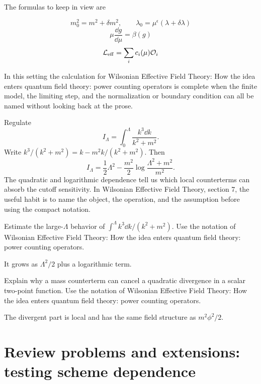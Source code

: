 The formulas to keep in view are

\[
  m_0^2=m^2+\delta m^2,\qquad \lambda_0=\mu^\epsilon(\lambda+\delta\lambda)
\]
\[
  \mu\frac{\dd g}{\dd\mu}=\beta(g)
\]
\[
  \mathcal L_{\mathrm{eff}}=\sum_i c_i(\mu)\mathcal O_i
\]

In this setting the calculation for Wilsonian Effective Field Theory: How the idea enters quantum field theory: power counting operators is complete when the finite model, the limiting step, and the normalization or boundary condition can all be named without looking back at the prose.




\begin{example}
Regulate
\[
  I_\Lambda=\int_0^\Lambda\frac{k^3\dd k}{k^2+m^2}.
\]
Write \(k^3/(k^2+m^2)=k-m^2k/(k^2+m^2)\).  Then
\[
  I_\Lambda=\frac12\Lambda^2-\frac{m^2}{2}\log\frac{\Lambda^2+m^2}{m^2}.
\]
The quadratic and logarithmic dependence tell us which local counterterms can absorb the cutoff sensitivity.  In Wilsonian Effective Field Theory, section 7, the useful habit is to name the object, the operation, and the assumption before using the compact notation.
\end{example}



\begin{exercise}
Estimate the large-\(\Lambda\) behavior of \(\int^\Lambda k^3\dd k/(k^2+m^2)\).  Use the notation of Wilsonian Effective Field Theory: How the idea enters quantum field theory: power counting operators.
\begin{answer}
It grows as \(\Lambda^2/2\) plus a logarithmic term.
\end{answer}
\end{exercise}

\begin{exercise}
Explain why a mass counterterm can cancel a quadratic divergence in a scalar two-point function.  Use the notation of Wilsonian Effective Field Theory: How the idea enters quantum field theory: power counting operators.
\begin{answer}
The divergent part is local and has the same field structure as \(m^2\phi^2/2\).
\end{answer}
\end{exercise}



\section{Review problems and extensions: testing scheme dependence}


